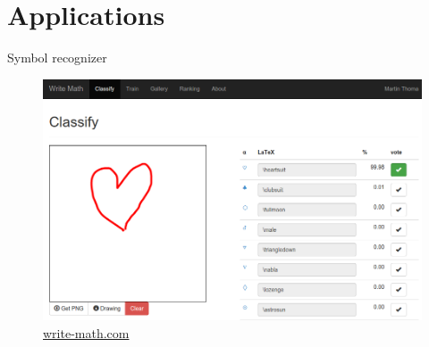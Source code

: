 \documentclass{beamer}
\begin{document}
\section{Applications}
\begin{frame}{Symbol recognizer}
\begin{figure}[ht]
    \centering
    \includegraphics[width=0.8\paperwidth, height=0.7\paperheight, keepaspectratio]{graphics/symbol-recognizer.png}
    \captionsetup{labelformat=empty}
    \caption{\href{http://write-math.com}{write-math.com}}
\end{figure}
\end{frame}

\end{document}
